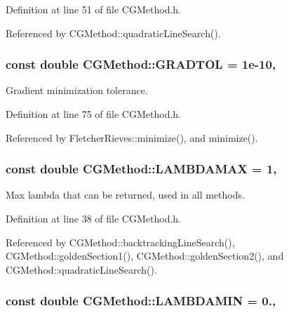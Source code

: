 Definition at line 51 of file C\+G\+Method.\+h.



Referenced by C\+G\+Method\+::quadratic\+Line\+Search().

\hypertarget{classCGMethod_ad0118dc4da7526f196a4b4172bba9625}{
\subsubsection[{G\+R\+A\+D\+T\+O\+L}]{\setlength{\rightskip}{0pt plus 5cm}const double C\+G\+Method\+::\+G\+R\+A\+D\+T\+O\+L = 1e-\/10\hspace{0.3cm}{\ttfamily [protected]}, {\ttfamily [inherited]}}}\label{classCGMethod_ad0118dc4da7526f196a4b4172bba9625}


Gradient minimization tolerance. 



Definition at line 75 of file C\+G\+Method.\+h.



Referenced by Fletcher\+Rieves\+::minimize(), and minimize().

\hypertarget{classCGMethod_a04127fd877e82fdf4f71cd3709581419}{
\subsubsection[{L\+A\+M\+B\+D\+A\+M\+A\+X}]{\setlength{\rightskip}{0pt plus 5cm}const double C\+G\+Method\+::\+L\+A\+M\+B\+D\+A\+M\+A\+X = 1\hspace{0.3cm}{\ttfamily [protected]}, {\ttfamily [inherited]}}}\label{classCGMethod_a04127fd877e82fdf4f71cd3709581419}


Max lambda that can be returned, used in all methods. 



Definition at line 38 of file C\+G\+Method.\+h.



Referenced by C\+G\+Method\+::backtracking\+Line\+Search(), C\+G\+Method\+::golden\+Section1(), C\+G\+Method\+::golden\+Section2(), and C\+G\+Method\+::quadratic\+Line\+Search().

\hypertarget{classCGMethod_ae28b20ab18f9a0b7c6a1c443add1026e}{
\subsubsection[{L\+A\+M\+B\+D\+A\+M\+I\+N}]{\setlength{\rightskip}{0pt plus 5cm}const double C\+G\+Method\+::\+L\+A\+M\+B\+D\+A\+M\+I\+N = 0.\hspace{0.3cm}{\ttfamily [protected]}, {\ttfamily [inherited]}}}\label{classCGMethod_ae28b20ab18f9a0b7c6a1c443add1026e}


